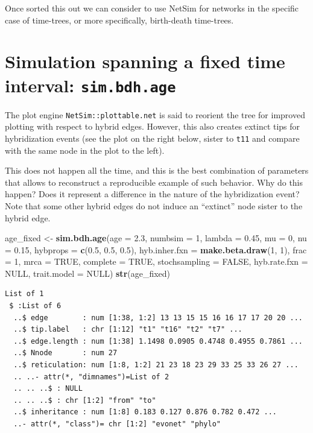 \documentclass[]{article}
\newenvironment{Shaded}{\begin{snugshade}}{\end{snugshade}}
\newcommand{\KeywordTok}[1]{\textcolor[rgb]{0.13,0.29,0.53}{\textbf{#1}}}
\newcommand{\DataTypeTok}[1]{\textcolor[rgb]{0.13,0.29,0.53}{#1}}
\newcommand{\DecValTok}[1]{\textcolor[rgb]{0.00,0.00,0.81}{#1}}
\newcommand{\FloatTok}[1]{\textcolor[rgb]{0.00,0.00,0.81}{#1}}
\newcommand{\StringTok}[1]{\textcolor[rgb]{0.31,0.60,0.02}{#1}}
\newcommand{\OtherTok}[1]{\textcolor[rgb]{0.56,0.35,0.01}{#1}}
\newcommand{\NormalTok}[1]{#1}
\begin{document}
Once sorted this out we can consider to use NetSim for networks in the
specific case of time-trees, or more specifically, birth-death
time-trees.

\section{\texorpdfstring{Simulation spanning a fixed time interval:
\texttt{sim.bdh.age}}{Simulation spanning a fixed time interval: sim.bdh.age}}\label{simulation-spanning-a-fixed-time-interval-sim.bdh.age}

The plot engine \texttt{NetSim::plottable.net} is said to reorient the
tree for improved plotting with respect to hybrid edges. However, this
also creates extinct tips for hybridization events (see the plot on the
right below, sister to \texttt{t11} and compare with the same node in
the plot to the left).

This does not happen all the time, and this is the best combination of
parameters that allows to reconstruct a reproducible example of such
behavior. Why do this happen? Does it represent a difference in the
nature of the hybridization event? Note that some other hybrid edges do
not induce an ``extinct'' node sister to the hybrid edge.

\begin{Shaded}
\begin{Highlighting}[]
\NormalTok{age_fixed <-}\StringTok{ }\KeywordTok{sim.bdh.age}\NormalTok{(}\DataTypeTok{age =} \FloatTok{2.3}\NormalTok{, }\DataTypeTok{numbsim =} \DecValTok{1}\NormalTok{, }\DataTypeTok{lambda =} \FloatTok{0.45}\NormalTok{, }\DataTypeTok{mu =} \DecValTok{0}\NormalTok{, }\DataTypeTok{nu =} \FloatTok{0.15}\NormalTok{, }
    \DataTypeTok{hybprops =} \KeywordTok{c}\NormalTok{(}\FloatTok{0.5}\NormalTok{, }\FloatTok{0.5}\NormalTok{, }\FloatTok{0.5}\NormalTok{), }\DataTypeTok{hyb.inher.fxn =} \KeywordTok{make.beta.draw}\NormalTok{(}\DecValTok{1}\NormalTok{, }\DecValTok{1}\NormalTok{), }\DataTypeTok{frac =} \DecValTok{1}\NormalTok{, }
    \DataTypeTok{mrca =} \OtherTok{TRUE}\NormalTok{, }\DataTypeTok{complete =} \OtherTok{TRUE}\NormalTok{, }\DataTypeTok{stochsampling =} \OtherTok{FALSE}\NormalTok{, }\DataTypeTok{hyb.rate.fxn =} \OtherTok{NULL}\NormalTok{, }\DataTypeTok{trait.model =} \OtherTok{NULL}\NormalTok{)}
\KeywordTok{str}\NormalTok{(age_fixed)}
\end{Highlighting}
\end{Shaded}

\begin{verbatim}
List of 1
 $ :List of 6
  ..$ edge        : num [1:38, 1:2] 13 13 15 15 16 16 17 17 20 20 ...
  ..$ tip.label   : chr [1:12] "t1" "t16" "t2" "t7" ...
  ..$ edge.length : num [1:38] 1.1498 0.0905 0.4748 0.4955 0.7861 ...
  ..$ Nnode       : num 27
  ..$ reticulation: num [1:8, 1:2] 21 23 18 23 29 33 25 33 26 27 ...
  .. ..- attr(*, "dimnames")=List of 2
  .. .. ..$ : NULL
  .. .. ..$ : chr [1:2] "from" "to"
  ..$ inheritance : num [1:8] 0.183 0.127 0.876 0.782 0.472 ...
  ..- attr(*, "class")= chr [1:2] "evonet" "phylo"
\end{verbatim}
\end{document}
